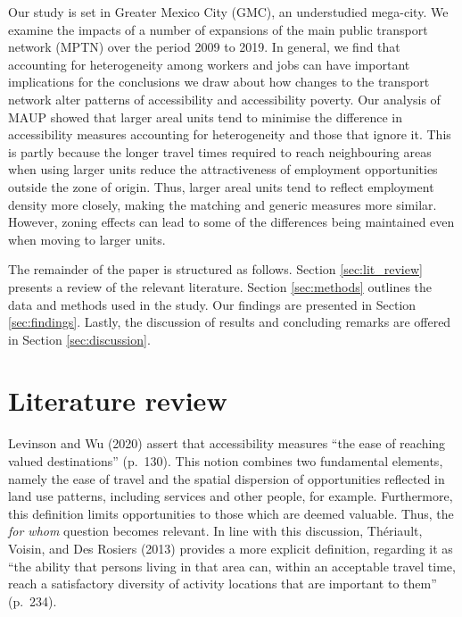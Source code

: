 \documentclass{article}
\begin{document}
Our study is set in Greater Mexico City (GMC), an understudied
mega-city. We examine the impacts of a number of expansions of the main
public transport network (MPTN) over the period 2009 to 2019. In
general, we find that accounting for heterogeneity among workers and
jobs can have important implications for the conclusions we draw about
how changes to the transport network alter patterns of accessibility and
accessibility poverty. Our analysis of MAUP showed that larger areal
units tend to minimise the difference in accessibility measures
accounting for heterogeneity and those that ignore it. This is partly
because the longer travel times required to reach neighbouring areas
when using larger units reduce the attractiveness of employment
opportunities outside the zone of origin. Thus, larger areal units tend
to reflect employment density more closely, making the matching and
generic measures more similar. However, zoning effects can lead to some
of the differences being maintained even when moving to larger units.

The remainder of the paper is structured as follows. Section
\ref{sec:lit_review} presents a review of the relevant literature.
Section \ref{sec:methods} outlines the data and methods used in the
study. Our findings are presented in Section \ref{sec:findings}. Lastly,
the discussion of results and concluding remarks are offered in Section
\ref{sec:discussion}.

\section{\texorpdfstring{Literature review
\label{sec:lit_review}}{Literature review }}\label{literature-review}

Levinson and Wu (2020) assert that accessibility measures ``the ease of
reaching valued destinations'' (p.~130). This notion combines two
fundamental elements, namely the ease of travel and the spatial
dispersion of opportunities reflected in land use patterns, including
services and other people, for example. Furthermore, this definition
limits opportunities to those which are deemed valuable. Thus, the
\emph{for whom} question becomes relevant. In line with this discussion,
Thériault, Voisin, and Des Rosiers (2013) provides a more explicit
definition, regarding it as ``the ability that persons living in that
area can, within an acceptable travel time, reach a satisfactory
diversity of activity locations that are important to them'' (p.~234).
\end{document}
